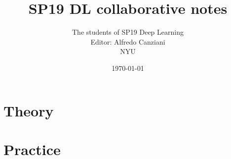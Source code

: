 \documentclass[oneside]{book}
\title{SP19 DL collaborative notes}
\author{
  The students of SP19 Deep Learning\\
  Editor: Alfredo Canziani\\
  NYU
}
\date{\today}
\begin{document}
\maketitle




\tableofcontents

\part{Theory}\label{prt:theory}
% 
% 
% 
% 
% 
% 
% 
% 
% 
% 
% 
% 
% 
% 
% 
% 
% 
% 
% 
% 
% 


\part{Practice}\label{prt:practice}
% 
% 
% 
% 
% 
% 
% 
% 
% 
% 
% 
% 

% 
% 
% 
% 
% 
% 
% 
\end{document}
